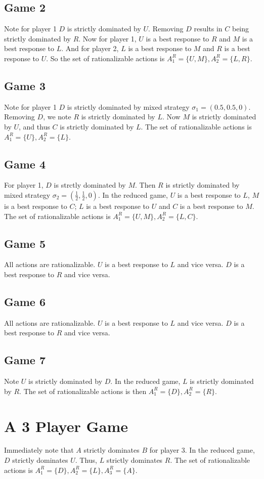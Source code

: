 \documentclass{article}
\begin{document}
\subsection{Game 2}
Note for player 1 $D$ is strictly dominated by $U$. Removing $D$ results in $C$ being strictly dominated by $R$. Now for player 1, $U$ is a best response to $R$ and $M$ is a best response to $L$. And for player 2, $L$ is a best response to $M$ and $R$ is a best response to $U$. So the set of rationalizable actions is $A_1^R = \{U,M\}, A_2^R = \{L,R\}$.
\subsection{Game 3}
Note for player 1 $D$ is strictly dominated by mixed strategy $\sigma_1 = (0.5,0.5,0)$. Removing $D$, we note $R$ is strictly dominated by $L$. Now $M$ is strictly dominated by $U$, and thus $C$ is strictly dominated by $L$. The set of rationalizable actions is $A_1^R = \{U\}, A_2^R = \{L\}$.
\subsection{Game 4}
For player 1, $D$ is strctly dominated by $M$. Then $R$ is strictly dominated by mixed strategy $\sigma_2 = (\frac{1}{2},\frac{1}{2},0)$. In the reduced game, $U$ is a best response to $L$, $M$ is a best response to $C$; $L$ is a best response to $U$ and $C$ is a best response to $M$. The set of rationalizable actions is $A_1^R = \{U,M\}, A_2^R = \{L,C\}$.
\subsection{Game 5}
All actions are rationalizable. $U$ is a best response to $L$ and vice versa. $D$ is a best response to $R$ and vice versa.
\subsection{Game 6}
All actions are rationalizable. $U$ is a best response to $L$ and vice versa. $D$ is a best response to $R$ and vice versa.
\subsection{Game 7}
Note $U$ is strictly dominated by $D$. In the reduced game, $L$ is strictly dominated by $R$. The set of rationalizable actions is then $A_1^R = \{D\}, A_2^R = \{R\}$.

\section{A 3 Player Game}
Immediately note that $A$ strictly dominates $B$ for player 3. In the reduced game, $D$ strictly dominates $U$. Thus, $L$ strictly dominates $R$. The set of rationalizable actions is $A_1^R = \{D\}, A_2^R = \{L\}, A_3^R = \{A\}$.
\end{document}
